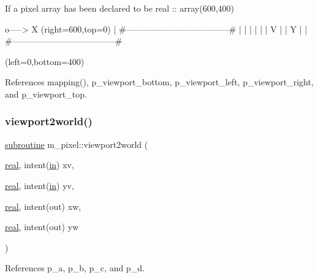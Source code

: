 If a pixel array has been declared to be real \+:\+: array(600,400) \begin{DoxyVerb} o-----> X                         (right=600,top=0)
 | #------------------------------------#
 | |                                    |
 | |                                    |
 V |                                    |
 Y |                                    |
   #------------------------------------#
\end{DoxyVerb}
 (left=0,bottom=400) 

References mapping(), p\+\_\+viewport\+\_\+bottom, p\+\_\+viewport\+\_\+left, p\+\_\+viewport\+\_\+right, and p\+\_\+viewport\+\_\+top.

\mbox{\label{namespacem__pixel_a9e23c9a3a5f3b1482986f067fbf8487f}} 
\subsubsection{\texorpdfstring{viewport2world()}{viewport2world()}}
{\footnotesize\ttfamily \hyperlink{M__stopwatch_83_8txt_acfbcff50169d691ff02d4a123ed70482}{subroutine} m\+\_\+pixel\+::viewport2world (\begin{DoxyParamCaption}\item[{\hyperlink{read__watch_83_8txt_abdb62bde002f38ef75f810d3a905a823}{real}, intent(\hyperlink{M__journal_83_8txt_afce72651d1eed785a2132bee863b2f38}{in})}]{xv,  }\item[{\hyperlink{read__watch_83_8txt_abdb62bde002f38ef75f810d3a905a823}{real}, intent(\hyperlink{M__journal_83_8txt_afce72651d1eed785a2132bee863b2f38}{in})}]{yv,  }\item[{\hyperlink{read__watch_83_8txt_abdb62bde002f38ef75f810d3a905a823}{real}, intent(out)}]{xw,  }\item[{\hyperlink{read__watch_83_8txt_abdb62bde002f38ef75f810d3a905a823}{real}, intent(out)}]{yw }\end{DoxyParamCaption})\hspace{0.3cm}{\ttfamily [private]}}



References p\+\_\+a, p\+\_\+b, p\+\_\+c, and p\+\_\+d.

\mbox{\label{namespacem__pixel_ac03ca8f23fdadb60599b6ea4dc87a6d9}} 
